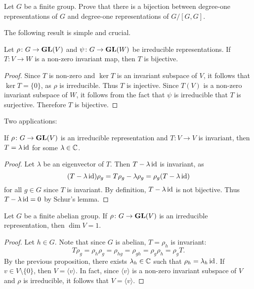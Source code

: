 \begin{exercise}
Let $G$ be a finite group.
Prove that there is a bijection between degree-one representations of $G$ and
degree-one representations of $G/[G,G]$.
\end{exercise}

The following result is simple and crucial. 

\begin{lemma}[Schur]
    Let $\rho\colon G\to\mathbf{GL}(V)$ and $\psi\colon G\to\mathbf{GL}(W)$ be irreducible representations. If 
    $T\colon V\to W$ is a non-zero invariant map, then $T$ is bijective.  
\end{lemma}

\begin{proof}
    Since $T$ is non-zero and $\ker T$ is an invariant subspace of $V$, it follows that $\ker T=\{0\}$, as $\rho$ is irreducible. Thus 
    $T$ is injective. Since $T(V)$ is a non-zero invariant subspace of $W$, it follows from the fact that $\psi$ is irreducible 
    that $T$ is surjective. Therefore $T$ 
    is bijective.  
\end{proof}

Two applications:

\begin{proposition}
    If $\rho\colon G\to\mathbf{GL}(V)$ is an irreducible representation and $T\colon V\to V$ is invariant, then 
    $T=\lambda\operatorname{id}$ for some $\lambda\in\mathbb{C}$. 
\end{proposition}

\begin{proof}
    Let $\lambda$ be an eigenvector of $T$. Then $T-\lambda\operatorname{id}$ is invariant, as 
    \[
    (T-\lambda\operatorname{id})\rho_g=T\rho_g-\lambda\rho_g=\rho_g(T-\lambda\operatorname{id})
    \]
    for all $g\in G$ since $T$ is invariant. By definition, 
    $T-\lambda\operatorname{id}$ is not bijective. Thus $T-\lambda\operatorname{id}=0$ by Schur's lemma.
\end{proof}

\begin{proposition}
    Let $G$ be a finite abelian group. 
    If $\rho\colon G\to\mathbf{GL}(V)$ is an irreducible representation, then
    $\dim V=1$. 
\end{proposition}

\begin{proof}
    Let $h\in G$. Note that since $G$ is abelian, $T=\rho_h$ is invariant:
    \[
    T\rho_g=\rho_h\rho_g=\rho_{hg}=\rho_{gh}=\rho_g\rho_h=\rho_gT.
    \]
    By the previous proposition, 
    there exists $\lambda_h\in\mathbb{C}$ such that $\rho_h=\lambda_h\operatorname{id}$. If $v\in V\setminus\{0\}$, 
    then $V=\langle v\rangle$. In fact, since 
    $\langle v\rangle$ is a non-zero invariant subspace of $V$ and $\rho$ is irreducible, 
    it follows that $V=\langle v\rangle$. 
\end{proof}

